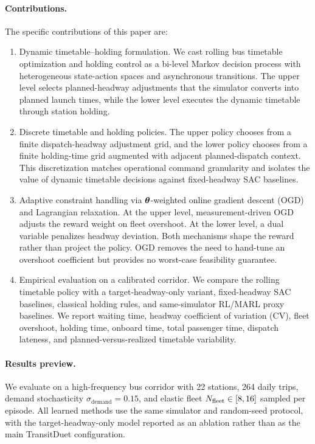 \paragraph{Contributions.}
The specific contributions of this paper are:
\begin{enumerate}
    \item Dynamic timetable--holding formulation. We cast rolling bus timetable optimization and holding control as a bi-level Markov decision process with heterogeneous state-action spaces and asynchronous transitions. The upper level selects planned-headway adjustments that the simulator converts into planned launch times, while the lower level executes the dynamic timetable through station holding.
    \item Discrete timetable and holding policies. The upper policy chooses from a finite dispatch-headway adjustment grid, and the lower policy chooses from a finite holding-time grid augmented with adjacent planned-dispatch context. This discretization matches operational command granularity and isolates the value of dynamic timetable decisions against fixed-headway SAC baselines.
    \item Adaptive constraint handling via $\boldsymbol{\theta}$-weighted online gradient descent (OGD) and Lagrangian relaxation. At the upper level, measurement-driven OGD adjusts the reward weight on fleet overshoot. At the lower level, a dual variable penalizes headway deviation. Both mechanisms shape the reward rather than project the policy. OGD removes the need to hand-tune an overshoot coefficient but provides no worst-case feasibility guarantee.
    \item Empirical evaluation on a calibrated corridor. We compare the rolling timetable policy with a target-headway-only variant, fixed-headway SAC baselines, classical holding rules, and same-simulator RL/MARL proxy baselines. We report waiting time, headway coefficient of variation (CV), fleet overshoot, holding time, onboard time, total passenger time, dispatch lateness, and planned-versus-realized timetable variability.
\end{enumerate}

\paragraph{Results preview.}
We evaluate on a high-frequency bus corridor with 22 stations, 264 daily trips, demand stochasticity $\sigma_{\mathrm{demand}} = 0.15$, and elastic fleet $N_{\mathrm{fleet}} \in [8, 16]$ sampled per episode. All learned methods use the same simulator and random-seed protocol, with the target-headway-only model reported as an ablation rather than as the main TransitDuet configuration.
